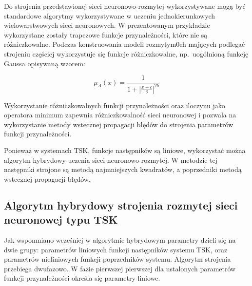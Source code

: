 \documentclass[a4paper,12pt,titlepage]{article}
\begin{document}
Do strojenia przedstawionej sieci neuronowo-rozmytej wykorzystywane mogą być standardowe algorytmy wykorzystywane w uczeniu jednokierunkowych wielowarstwowych sieci neuronowych. W prezentowanym przykładzie wykorzystane zostały trapezowe funkcje przynależności, które nie są różniczkowalne. Podczas konstruowania modeli rozmytym0ch mających podlegać strojeniu częściej wykorzystuje się funkcje różniczkowalne, np.\ uogólnioną funkcję Gaussa opisywaną wzorem:

\begin{equation}
\mu _A (x) = \frac{1}{1 + | \frac{x - c}{\delta} | ^{2b}}
\end{equation}

Wykorzystanie różniczkowalnych funkcji przynależności oraz iloczynu jako operatora minimum zapewnia różniczkowalność sieci neuronowej i pozwala na wykorzystanie metody wstecznej propagacji błędów do strojenia parametrów funkcji przynależności.

Ponieważ w systemach TSK, funkcje następników są liniowe, wykorzystać można algorytm hybrydowy uczenia sieci neuronowo-rozmytej. W metodzie tej następniki strojone są metodą najmniejszych kwadratów, a poprzedniki metodą wstecznej propagacji błędów.

\subsection{Algorytm hybrydowy strojenia rozmytej sieci neuronowej typu TSK}

Jak wspomniano wcześniej w algorytmie hybrydowym parametry dzieli się na dwie grupy: parametrów liniowych funkcji następników systemu TSK, oraz parametrów nieliniowych funkcji poprzedników systemu. Algorytm strojenia przebiega dwufazowo. W fazie pierwszej pierwszej dla ustalonych parametrów funkcji przynależności określa się parametry liniowe.
\end{document}
